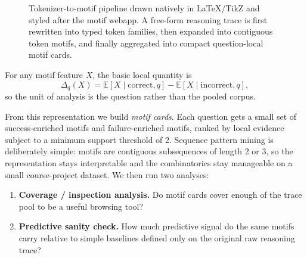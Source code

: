 \documentclass[11pt]{article}
\begin{document}
\begin{figure}[t]
\caption{Tokenizer-to-motif pipeline drawn natively in LaTeX/TikZ and styled after the motif webapp. A free-form reasoning trace is first rewritten into typed token families, then expanded into contiguous token motifs, and finally aggregated into compact question-local motif cards.}
\label{fig:tokenizer-motif-pipeline}
\end{figure}

For any motif feature $X$, the basic local quantity is
\begin{equation}
\Delta_q(X)=\mathbb{E}[X \mid \text{correct}, q]-\mathbb{E}[X \mid \text{incorrect}, q],
\label{eq:delta}
\end{equation}
so the unit of analysis is the question rather than the pooled corpus.

From this representation we build \emph{motif cards}. Each question gets a small set of success-enriched motifs and failure-enriched motifs, ranked by local evidence subject to a minimum support threshold of 2. Sequence pattern mining is deliberately simple: motifs are contiguous subsequences of length 2 or 3, so the representation stays interpretable and the combinatorics stay manageable on a small course-project dataset. We then run two analyses:
\begin{enumerate}[leftmargin=*]
\item \textbf{Coverage / inspection analysis.} Do motif cards cover enough of the trace pool to be a useful browsing tool?
\item \textbf{Predictive sanity check.} How much predictive signal do the same motifs carry relative to simple baselines defined only on the original raw reasoning trace?
\end{enumerate}
\end{document}
